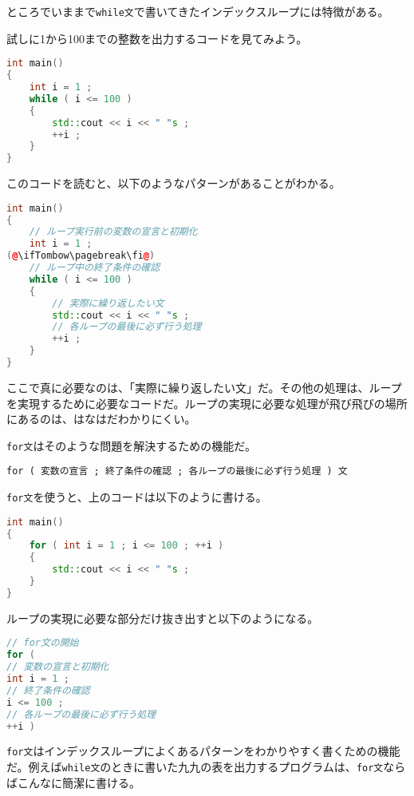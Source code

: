 ところでいままで\texttt{while文}で書いてきたインデックスループには特徴がある。

試しに1から100までの整数を出力するコードを見てみよう。

\begin{lstlisting}[language={C++}]
int main()
{
    int i = 1 ;
    while ( i <= 100 )
    {
        std::cout << i << " "s ;
        ++i ;
    }
}
\end{lstlisting}

このコードを読むと、以下のようなパターンがあることがわかる。

\begin{lstlisting}[language={C++}]
int main()
{
    // ループ実行前の変数の宣言と初期化
    int i = 1 ;
(@\ifTombow\pagebreak\fi@)
    // ループ中の終了条件の確認
    while ( i <= 100 )
    {
        // 実際に繰り返したい文
        std::cout << i << " "s ;
        // 各ループの最後に必ず行う処理
        ++i ;
    }
}
\end{lstlisting}

ここで真に必要なのは、「実際に繰り返したい文」だ。その他の処理は、ループを実現するために必要なコードだ。ループの実現に必要な処理が飛び飛びの場所にあるのは、はなはだわかりにくい。

\texttt{for文}はそのような問題を解決するための機能だ。

\begin{lstlisting}[style=grammar]
for ( 変数の宣言 ; 終了条件の確認 ; 各ループの最後に必ず行う処理 ) 文
\end{lstlisting}

\texttt{for文}を使うと、上のコードは以下のように書ける。

\begin{lstlisting}[language={C++}]
int main()
{
    for ( int i = 1 ; i <= 100 ; ++i )
    {
        std::cout << i << " "s ;
    } 
}
\end{lstlisting}

ループの実現に必要な部分だけ抜き出すと以下のようになる。

\begin{lstlisting}[language={C++}]
// for文の開始
for (
// 変数の宣言と初期化
int i = 1 ;
// 終了条件の確認
i <= 100 ;
// 各ループの最後に必ず行う処理
++i )
\end{lstlisting}

\texttt{for文}はインデックスループによくあるパターンをわかりやすく書くための機能だ。例えば\texttt{while文}のときに書いた九九の表を出力するプログラムは、\texttt{for文}ならばこんなに簡潔に書ける。

